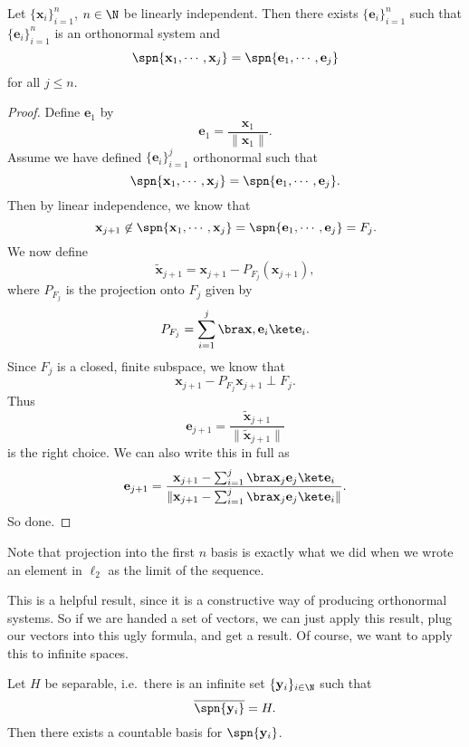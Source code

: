 \documentclass[a4paper]{article}
\begin{document}
\begin{prop}
  Let $\{\mathbf{x}_i\}_{i = 1}^n$, $n \in \N$ be linearly independent. Then there exists $\{\mathbf{e}_i\}_{i = 1}^n$ such that $\{\mathbf{e}_i\}_{i = 1}^n$ is an orthonormal system and
  \[
    \spn\{\mathbf{x}_1, \cdots, \mathbf{x}_j\} = \spn\{\mathbf{e}_1, \cdots, \mathbf{e}_j\}
  \]
  for all $j \leq n$.
\end{prop}

\begin{proof}
  Define $\mathbf{e}_1$ by
  \[
    \mathbf{e}_1 = \frac{\mathbf{x}_1}{\|\mathbf{x}_1\|}.
  \]
  Assume we have defined $\{\mathbf{e}_i\}_{i = 1}^j$ orthonormal such that
  \[
    \spn\{\mathbf{x}_1, \cdots, \mathbf{x}_j\} = \spn\{\mathbf{e}_1, \cdots, \mathbf{e}_j\}.
  \]
  Then by linear independence, we know that
  \[
    \mathbf{x}_{j + 1} \not\in \spn\{\mathbf{x}_1, \cdots, \mathbf{x}_j\} = \spn\{\mathbf{e}_1, \cdots, \mathbf{e}_j\} = F_j.
  \]
  We now define
  \[
    \tilde{\mathbf{x}}_{j + 1} = \mathbf{x}_{j + 1} - P_{F_j}(\mathbf{x}_{j + 1}),
  \]
  where $P_{F_j}$ is the projection onto $F_j$ given by
  \[
    P_{F_j} = \sum_{i = 1}^j \bra \mathbf{x}, \mathbf{e}_i\ket \mathbf{e}_i.
  \]
  Since $F_j$ is a closed, finite subspace, we know that
  \[
    \mathbf{x}_{j + 1} - P_{F_j} \mathbf{x}_{j + 1} \perp F_j.
  \]
  Thus
  \[
    \mathbf{e}_{j + 1} = \frac{\tilde{\mathbf{x}}_{j + 1}}{\|\tilde{\mathbf{x}}_{j + 1}\|}
  \]
  is the right choice. We can also write this in full as
  \[
    \mathbf{e}_{j + 1} = \frac{\mathbf{x}_{j + 1} - \sum_{i = 1}^j \bra \mathbf{x}_j \mathbf{e}_j\ket \mathbf{e}_i}{\|\mathbf{x}_{j + 1} - \sum_{i = 1}^j \bra \mathbf{x}_j \mathbf{e}_j\ket \mathbf{e}_i\|}.
  \]
  So done.
\end{proof}
Note that projection into the first $n$ basis is exactly what we did when we wrote an element in $\ell_2$ as the limit of the sequence.

This is a helpful result, since it is a constructive way of producing orthonormal systems. So if we are handed a set of vectors, we can just apply this result, plug our vectors into this ugly formula, and get a result. Of course, we want to apply this to infinite spaces.

\begin{prop}
  Let $H$ be separable, i.e.\ there is an infinite set $\{\mathbf{y}_i\}_{i \in \N}$ such that
  \[
    \overline{\spn \{\mathbf{y}_i\}} = H.
  \]
  Then there exists a countable basis for $\spn \{\mathbf{y}_i\}$.
\end{prop}
\end{document}
